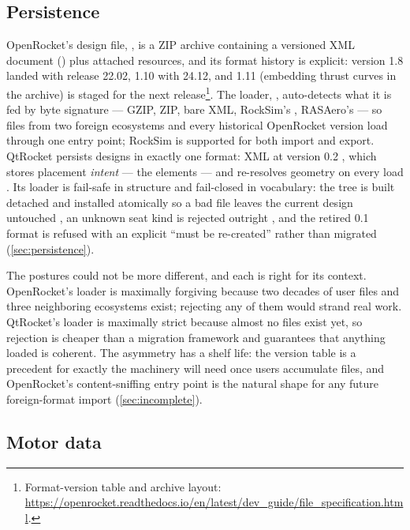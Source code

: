 \subsection{Persistence}\label{app:or-architecture-persist}

OpenRocket's design file, , is a ZIP archive containing a versioned XML document
() plus attached resources, and its format history is explicit: version
1.8 landed with release 22.02, 1.10 with 24.12, and 1.11 (embedding thrust curves in the
archive) is staged for the next release\footnote{Format-version table and archive layout:
\url{https://openrocket.readthedocs.io/en/latest/dev_guide/file_specification.html}.}.
The loader, , auto-detects what it is fed by byte signature ---
GZIP, ZIP, bare  XML, RockSim's , RASAero's
 --- so files from two foreign ecosystems and every historical
OpenRocket version load through one entry point; RockSim is supported for both import and
export. QtRocket persists designs in exactly one format:  XML at version 0.2
, which stores placement \emph{intent} --- the
 elements --- and re-resolves geometry on every load
. Its loader is fail-safe in structure and fail-closed
in vocabulary: the tree is built detached and installed atomically so a bad file leaves the
current design untouched , an unknown seat kind is
rejected outright , and the retired 0.1 format is
refused with an explicit ``must be re-created'' rather than migrated
 (\cref{sec:persistence}).

The postures could not be more different, and each is right for its context. OpenRocket's
loader is maximally forgiving because two decades of user files and three neighboring
ecosystems exist; rejecting any of them would strand real work. QtRocket's loader is
maximally strict because almost no files exist yet, so rejection is cheaper than a
migration framework and guarantees that anything loaded is coherent. The asymmetry has a
shelf life: the  version table is a precedent for exactly the machinery
 will need once users accumulate files, and OpenRocket's content-sniffing entry
point is the natural shape for any future foreign-format import
(\cref{sec:incomplete}).

\subsection{Motor data}\label{app:or-architecture-motors}

